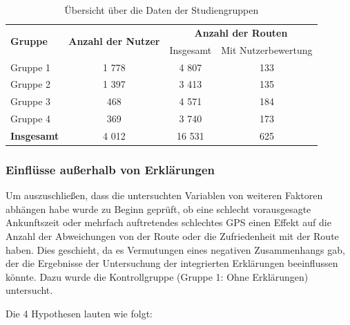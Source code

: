 \begin{table}[htb!]
    \begin{center}
        \begin{tabular}{|l|c|c|c|}
            \hline
            \multirow{2}{*}{\textbf{Gruppe}} & \multirow{2}{*}{\textbf{Anzahl der Nutzer}} & \multicolumn{2}{|c|}{\textbf{Anzahl der Routen}} \\ \cline{3-4}
            & & Insgesamt & Mit Nutzerbewertung \\ \hline \hline
            Gruppe 1            & 1 778  & 4 807  & 133 \\ \hline
            Gruppe 2            & 1 397  & 3 413  & 135 \\ \hline
            Gruppe 3            & 468   & 4 571  & 184 \\ \hline
            Gruppe 4            & 369   & 3 740  & 173 \\ \hline \hline
            \textbf{Insgesamt}  & 4 012  & 16 531 & 625 \\ \hline
        \end{tabular}
    \end{center}
    \caption{Übersicht über die Daten der Studiengruppen}
    \label{tab:study_user_group_overview}
\end{table}

\subsubsection{Einflüsse außerhalb von Erklärungen}

Um auszuschließen, dass die untersuchten Variablen von weiteren Faktoren abhängen habe wurde zu Beginn geprüft, ob eine schlecht vorausgesagte Ankunftszeit oder mehrfach auftretendes schlechtes GPS einen Effekt auf die Anzahl der Abweichungen von der Route oder die Zufriedenheit mit der Route haben. Dies geschieht, da es Vermutungen eines negativen Zusammenhangs gab, der die Ergebnisse der Untersuchung der integrierten Erklärungen beeinflussen könnte. Dazu wurde die Kontrollgruppe (Gruppe 1: Ohne Erklärungen) untersucht.

Die 4 Hypothesen lauten wie folgt:

